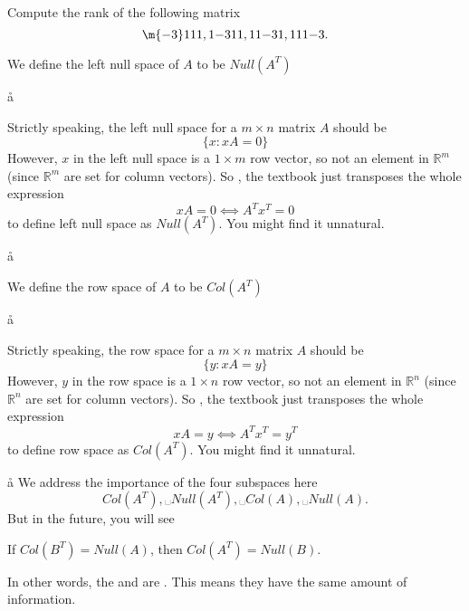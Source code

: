 
\exe Compute the rank of the following matrix
$$
\m{-3}111,
1{-3}11,
11{-3}1,
111{-3}.
$$

\aaa





\begin{defi}
We define the left null space of $A$ to be $Null(A^T)$
\end{defi}

\a\aa
\begin{rem}
Strictly speaking, the left null space for a $m × n$ matrix $A$ should be 
$$
\{x: xA = 0\}
$$
However, $x$ in the left null space is a $1 × m$ row vector, so not an element in $ℝ^m$ (since $ℝ^m$ are set for column vectors). So , the textbook just transposes the whole expression
$$
xA = 0 ⟺   A^Tx^T  = 0
$$
to define left null space as $Null(A^T)$. You might find it unnatural.
\end{rem}

\a\aa
\begin{defi}
We define the row space of $A$ to be $Col(A^T)$
\end{defi}
\a\aa
\begin{rem}
Strictly speaking, the row space for a $m × n$ matrix $A$ should be 
$$
\{y: xA = y\}
$$
However, $y$ in the row space is a $1 × n$ row vector, so not an element in $ℝ^n$ (since $ℝ^n$ are set for column vectors). So , the textbook just transposes the whole expression
$$
xA = y ⟺   A^Tx^T  = y^T
$$
to define row space as $Col(A^T)$. You might find it unnatural.
\end{rem}
\a\aa
We address the importance of the four subspaces here
$$
Col(A^T), ␣ Null(A^T), ␣ Col(A), ␣ Null(A).
$$
But in the future, you will see

\begin{prop}
If $Col(B^T) = Null(A)$, then $Col(A^T)=Null(B)$.
\end{prop}
In other words, the  and  are . This means they have the same amount of information.

